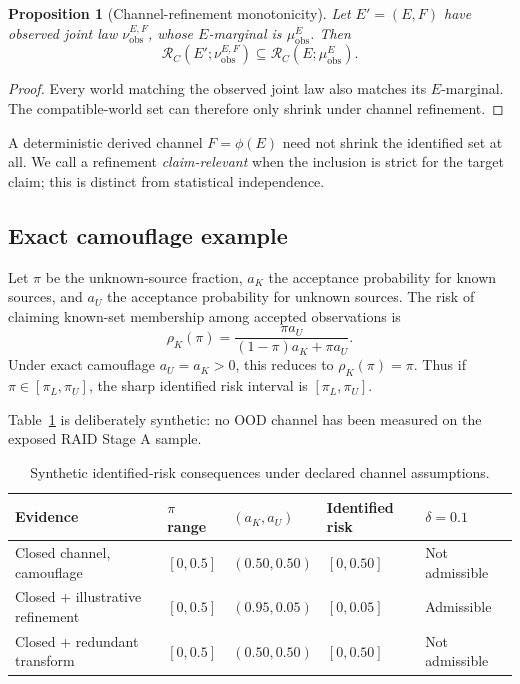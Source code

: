 \documentclass[11pt]{article}
\newtheorem{proposition}{Proposition}
\begin{document}
\begin{proposition}[Channel-refinement monotonicity]
Let $E'=(E,F)$ have observed joint law $\nu_{\mathrm{obs}}^{E,F}$, whose
$E$-marginal is $\mu_{\mathrm{obs}}^E$. Then
\[
\mathcal R_C(E';\nu_{\mathrm{obs}}^{E,F})
\subseteq
\mathcal R_C(E;\mu_{\mathrm{obs}}^E).
\]
\end{proposition}

\begin{proof}
Every world matching the observed joint law also matches its $E$-marginal.
The compatible-world set can therefore only shrink under channel refinement.
\end{proof}

A deterministic derived channel $F=\phi(E)$ need not shrink the identified set
at all. We call a refinement \emph{claim-relevant} when the inclusion is
strict for the target claim; this is distinct from statistical independence.

\subsection{Exact camouflage example}

Let $\pi$ be the unknown-source fraction, $a_K$ the acceptance probability for
known sources, and $a_U$ the acceptance probability for unknown sources. The
risk of claiming known-set membership among accepted observations is
\[
\rho_K(\pi)
=
\frac{\pi a_U}{(1-\pi)a_K+\pi a_U}.
\]
Under exact camouflage $a_U=a_K>0$, this reduces to $\rho_K(\pi)=\pi$.
Thus if $\pi\in[\pi_L,\pi_U]$, the sharp identified risk interval is
$[\pi_L,\pi_U]$.

Table~\ref{tab:identified} is deliberately synthetic: no OOD channel has been
measured on the exposed RAID Stage A sample.

\begin{table}[h]
\centering
\caption{Synthetic identified-risk consequences under declared channel assumptions.}
\label{tab:identified}
\begin{tabular}{lllll}
\toprule
Evidence & $\pi$ range & $(a_K,a_U)$ & Identified risk & $\delta=0.1$ \\
\midrule
Closed channel, camouflage & $[0,0.5]$ & $(0.50,0.50)$ & $[0,0.50]$ & Not admissible \\
Closed + illustrative refinement & $[0,0.5]$ & $(0.95,0.05)$ & $[0,0.05]$ & Admissible \\
Closed + redundant transform & $[0,0.5]$ & $(0.50,0.50)$ & $[0,0.50]$ & Not admissible \\
\bottomrule
\end{tabular}
\end{table}
\end{document}
